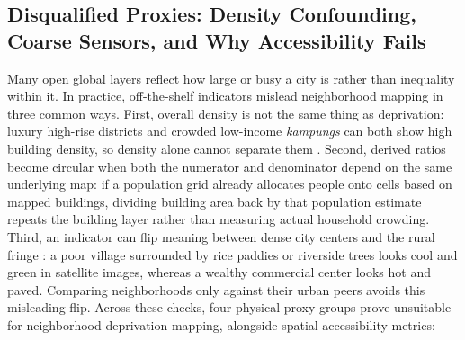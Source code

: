 \subsection{Disqualified Proxies: Density Confounding, Coarse Sensors, and Why Accessibility Fails}
Many open global layers reflect how large or busy a city is rather than inequality within it. In practice, off-the-shelf indicators mislead neighborhood mapping in three common ways. First, overall density is not the same thing as deprivation: luxury high-rise districts and crowded low-income \textit{kampungs} can both show high building density, so density alone cannot separate them \citep{Taubenbock2018}. Second, derived ratios become circular when both the numerator and denominator depend on the same underlying map: if a population grid already allocates people onto cells based on mapped buildings, dividing building area back by that population estimate repeats the building layer rather than measuring actual household crowding. Third, an indicator can flip meaning between dense city centers and the rural fringe \citep{Chakraborty2019a, Stewart2012}: a poor village surrounded by rice paddies or riverside trees looks cool and green in satellite images, whereas a wealthy commercial center looks hot and paved. Comparing neighborhoods only against their urban peers avoids this misleading flip. Across these checks, four physical proxy groups prove unsuitable for neighborhood deprivation mapping, alongside spatial accessibility metrics:

